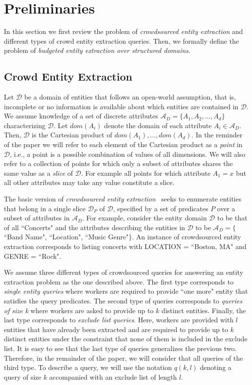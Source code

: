 \documentclass{sig-alternate}
\newcommand{\domain}{\mathcal{D}}
\newcommand{\attributes}{\mathcal{A}_D}
\begin{document}
\section{Preliminaries}
In this section we first review the problem of {\em crowdsourced entity extraction} and different types of crowd entity extraction queries. Then, we formally define the problem of {\em budgeted entity extraction over structured domains}. 

\subsection{Crowd Entity Extraction}
Let $\domain$ be a domain of entities that follows an open-world assumption, that is, incomplete or no information is available about which entities are contained in $\domain$. We assume knowledge of a set of discrete attributes $\attributes = \{A_1, A_2, \dots, A_d\}$ characterizing $\domain$. Let $dom(A_i)$ denote the domain of each attribute $A_i  \in \attributes$. Then, $\domain$ is the Cartesian product of $dom(A_1), \dots, dom(A_d)$. In the reminder of the paper we will refer to each element of the Cartesian product as a {\em point} in $\domain$, i.e., a point is a possible combination of values of all dimensions. We will also refer to a collection of points for which only a subset of attributes shares the same value as a {\em slice} of $\domain$. For example all points for which attribute $A_1 = x$ but all other attributes may take any value constitute a slice. 

The basic version of {\em crowdsourced entity extraction}~\cite{trushkowsky:2013} seeks to enumerate entities that belong in a single slice $\domain_P$ of $\domain$, specified by a set of predicates $P$ over a subset of attributes in $\attributes$. For example, consider the entity domain $\domain$ to be that of all ``Concerts" and the attributes describing the entities in $\domain$ to be $\attributes = \{$``Band Name", ``Location", ``Music Genre"$\}$. An instance of crowdsourced entity extraction corresponds to listing concerts with LOCATION = ``Boston, MA" and GENRE = ``Rock". 

We assume three different types of crowdsourced queries for answering an entity extraction problem as the one described above. The first type corresponds to {\em single entity queries} where workers are required to provide ``one more" entity that satisfies the query predicates. The second type of queries corresponds to {\em queries of  size k} where workers are asked to provide up to $k$ distinct entities. Finally, the last type corresponds to {\em exclude list queries}. Here,  workers are provided with $l$ entities that have already been extracted and are required to provide up to $k$ distinct entities under the constraint that none of them is included in the exclude list. It is easy to see that the last type of queries generalizes the previous two. Therefore, in the remainder of the paper, we will consider that all queries of the third type. To describe a query, we will use the notation $q(k,l)$ denoting a query of size $k$ accompanied with an exclude list of length $l$. 
\end{document}
